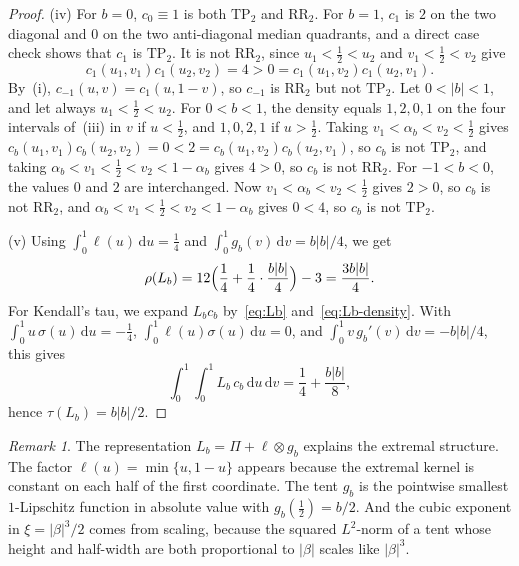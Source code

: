 \documentclass[twocolumn,a4paper]{article}
\makeatletter
\renewcommand\section{\@startsection{section}{1}{\z@}{-3.5ex \@plus -1ex \@minus -.2ex}{2.3ex \@plus.2ex}{\normalfont\Large\bfseries\raggedright}}
\numberwithin{equation}{section}
\theoremstyle{remark}
\newtheorem{remark}[theorem]{Remark}
\newcommand{\1}{\mathbf{1}}
\newcommand{\de}{\,\mathrm{d}}
\newcommand{\TPtwo}{\mathrm{TP}_2}
\newcommand{\RRtwo}{\mathrm{RR}_2}
\makeatother
\begin{document}
\begin{proof}
(iv) For \(b=0\), \(c_0\equiv1\) is both \(\TPtwo\) and \(\RRtwo\).
For \(b=1\), \(c_1\) is \(2\) on the two diagonal and \(0\) on the two anti-diagonal median quadrants, and a direct case check shows that \(c_1\) is \(\TPtwo\).
It is not \(\RRtwo\), since \(u_1<\tfrac12<u_2\) and \(v_1<\tfrac12<v_2\) give
\[
c_1(u_1,v_1)c_1(u_2,v_2)=4>0=c_1(u_1,v_2)c_1(u_2,v_1).
\]
By~(i), \(c_{-1}(u,v)=c_1(u,1-v)\), so \(c_{-1}\) is \(\RRtwo\) but not \(\TPtwo\).
Let \(0<|b|<1\), and let always \(u_1<\tfrac12<u_2\).
For \(0<b<1\), the density equals \(1,2,0,1\) on the four intervals of~(iii) in \(v\) if \(u<\tfrac12\), and \(1,0,2,1\) if \(u>\tfrac12\).
Taking \(v_1<\alpha_b<v_2<\tfrac12\) gives \(c_b(u_1,v_1)c_b(u_2,v_2)=0<2=c_b(u_1,v_2)c_b(u_2,v_1)\), so \(c_b\) is not \(\TPtwo\), and taking \(\alpha_b<v_1<\tfrac12<v_2<1-\alpha_b\) gives \(4>0\), so \(c_b\) is not \(\RRtwo\).
For \(-1<b<0\), the values \(0\) and \(2\) are interchanged.
Now \(v_1<\alpha_b<v_2<\tfrac12\) gives \(2>0\), so \(c_b\) is not \(\RRtwo\), and \(\alpha_b<v_1<\tfrac12<v_2<1-\alpha_b\) gives \(0<4\), so \(c_b\) is not \(\TPtwo\).

(v) Using \(\int_0^1\ell(u)\de u=\tfrac14\) and \(\int_0^1g_b(v)\de v=b|b|/4\), we get
\[
\rho(L_b)=12\Bigl(\frac14+\frac14\cdot\frac{b|b|}4\Bigr)-3=\frac{3b|b|}4.
\]
For Kendall's tau, we expand \(L_bc_b\) by~\eqref{eq:Lb} and~\eqref{eq:Lb-density}.
With \(\int_0^1u\,\sigma(u)\de u=-\tfrac14\), \(\int_0^1\ell(u)\sigma(u)\de u=0\), and \(\int_0^1v\,g_b'(v)\de v=-b|b|/4\), this gives
\[
\int_0^1\!\!\int_0^1L_b\,c_b\de u\de v=\frac14+\frac{b|b|}8,
\]
hence \(\tau(L_b)=b|b|/2\).
\end{proof}

\begin{remark}\label{rem:mechanism}
The representation \(L_b=\Pi+\ell\otimes g_b\) explains the extremal structure.
The factor \(\ell(u)=\min\{u,1-u\}\) appears because the extremal kernel is constant on each half of the first coordinate.
The tent \(g_b\) is the pointwise smallest \(1\)-Lipschitz function in absolute value with \(g_b(\tfrac12)=b/2\).
And the cubic exponent in \(\xi=|\beta|^3/2\) comes from scaling, because the squared \(L^2\)-norm of a tent whose height and half-width are both proportional to \(|\beta|\) scales like \(|\beta|^3\).
\end{remark}

\section{The region for all copulas}\label{sec:proof-main}
\end{document}
